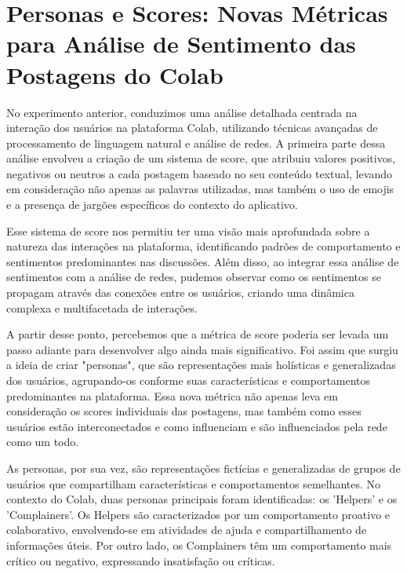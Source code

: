 \section{Personas e Scores: Novas Métricas para Análise de Sentimento das Postagens do Colab}

No experimento anterior, conduzimos uma análise detalhada centrada na interação dos usuários na plataforma Colab, utilizando técnicas avançadas de processamento de linguagem natural e análise de redes. A primeira parte dessa análise envolveu a criação de um sistema de score, que atribuiu valores positivos, negativos ou neutros a cada postagem baseado no seu conteúdo textual, levando em consideração não apenas as palavras utilizadas, mas também o uso de emojis e a presença de jargões específicos do contexto do aplicativo.

Esse sistema de score nos permitiu ter uma visão mais aprofundada sobre a natureza das interações na plataforma, identificando padrões de comportamento e sentimentos predominantes nas discussões. Além disso, ao integrar essa análise de sentimentos com a análise de redes, pudemos observar como os sentimentos se propagam através das conexões entre os usuários, criando uma dinâmica complexa e multifacetada de interações.

A partir desse ponto, percebemos que a métrica de score poderia ser levada um passo adiante para desenvolver algo ainda mais significativo. Foi assim que surgiu a ideia de criar "personas", que são representações mais holísticas e generalizadas dos usuários, agrupando-os conforme suas características e comportamentos predominantes na plataforma. Essa nova métrica não apenas leva em consideração os scores individuais das postagens, mas também como esses usuários estão interconectados e como influenciam e são influenciados pela rede como um todo.

As personas, por sua vez, são representações fictícias e generalizadas de grupos de usuários que compartilham características e comportamentos semelhantes. No contexto do Colab, duas personas principais foram identificadas: os 'Helpers' e os 'Complainers'. Os Helpers são caracterizados por um comportamento proativo e colaborativo, envolvendo-se em atividades de ajuda e compartilhamento de informações úteis. Por outro lado, os Complainers têm um comportamento mais crítico ou negativo, expressando insatisfação ou críticas.

